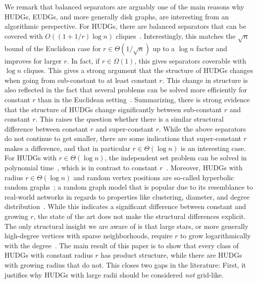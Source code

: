 \documentclass[11pt]{article}
\begin{document}
We remark that balanced separators are arguably one of the main reasons why HUDGs, EUDGs, and more generally disk graphs, are interesting from an algorithmic perspective.
For HUDGs, there are balanced separators that can be covered with $ O((1 + 1/r) \log n) $ cliques~\cite{Struc_Indep_Hyper_Unifor_Disk_Graph-Blaesius25}.
Interestingly, this matches the $\sqrt{n}$ bound of the Euclidean case for $r \in \Theta(1/\sqrt{n})$ up to a $\log n$ factor and improves for larger $r$.
In fact, if $r \in \Omega(1)$, this gives separators coverable with $\log n$ cliques.
This gives a strong argument that the structure of HUDGs changes when going from sub-constant to at least constant $r$.
This change in structure is also reflected in the fact that several problems can be solved more efficiently for constant $r$ than in the Euclidean setting~\cite{kisfaludi_hyperbolic_2019,Struc_Indep_Hyper_Unifor_Disk_Graph-Blaesius25}.
Summarizing, there is strong evidence that the structure of HUDGs change significantly between sub-constant $r$ and constant $r$.
%
This raises the question whether there is a similar structural difference between constant $r$ and super-constant $r$.
While the above separators do not continue to get smaller, there are some indications that super-constant $r$ makes a difference, and that in particular $r \in \Theta(\log n)$ is an interesting case.
For HUDGs with $r \in \Theta(\log n)$, the independent set problem can be solved in polynomial time~\cite{Struc_Indep_Hyper_Unifor_Disk_Graph-Blaesius25}, which is in contrast to constant $r$~\cite{kisfaludi_hyperbolic_2019}.
Moreover, HUDGs with radius $r \in \Theta(\log n)$ and random vertex positions are so-called hyperbolic random graphs~\cite{krioukov_hyperbolic_2010}; a random graph model that is popular due to its resemblance to real-world networks in regards to properties like clustering, diameter, and degree distribution~\cite{friedrich_diameter_2018,friedrich_diameter_2018_conf,Random_Hyper_Graph-Gugel12}.
While this indicates a significant difference between constant and growing $r$, the state of the art does not make the structural differences explicit.
The only structural insight we are aware of is that large stars, or more generally high-degree vertices with sparse neighborhoods, require $r$ to grow logarithmically with the degree~\cite{blasius_strongly_2023}.
%
The main result of this paper is to show that every class of HUDGs with constant radius $r$ has product structure, while there are HUDGs with growing radius that do not.
This closes two gaps in the literature: First, it justifies why HUDGs with large radii should be considered \emph{not} grid-like.
\end{document}
